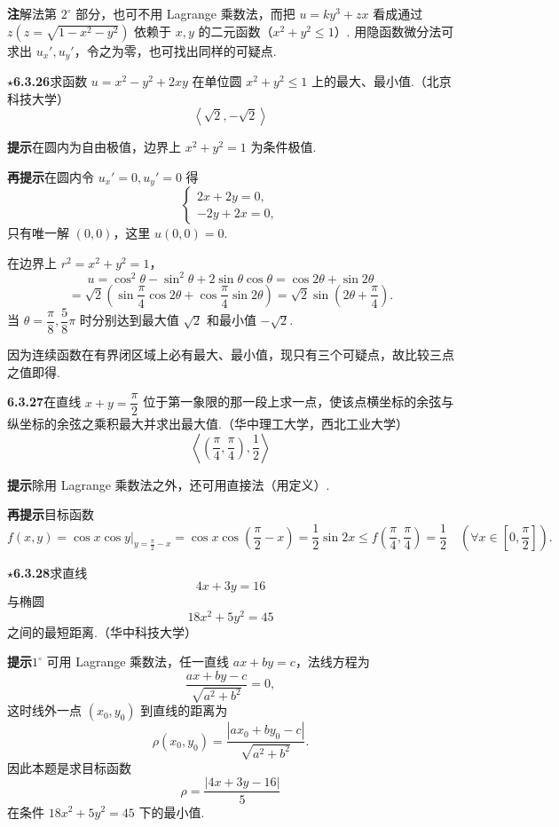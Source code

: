 \documentclass[UTF8,12pt,a4paper,fontset=fandol]{ctexart}
\begin{document}
\noindent\textbf{注}\quad 解法第 $2^\circ$ 部分，也可不用 Lagrange 乘数法，而把 $u=ky^3+zx$ 看成通过 $z(z=\sqrt{1-x^2-y^2})$ 依赖于 $x,y$ 的二元函数（$x^2+y^2\le1$）. 用隐函数微分法可求出 $u_x',u_y'$，令之为零，也可找出同样的可疑点.

\noindent\textbf{\ensuremath{\star}6.3.26}\quad 求函数 $u=x^2-y^2+2xy$ 在单位圆 $x^2+y^2\le1$ 上的最大、最小值.（北京科技大学）
\[
  \left\langle\sqrt2,-\sqrt2\right\rangle
\]

\noindent\textbf{提示}\quad 在圆内为自由极值，边界上 $x^2+y^2=1$ 为条件极值.

\noindent\textbf{再提示}\quad 在圆内令 $u_x'=0,u_y'=0$ 得
\[
  \begin{cases}
    2x+2y=0,\\
    -2y+2x=0,
  \end{cases}
\]
只有唯一解 $(0,0)$，这里 $u(0,0)=0$.

在边界上 $r^2=x^2+y^2=1$，
\[
  u=\cos^2\theta-\sin^2\theta+2\sin\theta\cos\theta
  =\cos2\theta+\sin2\theta
\]
\[
  =\sqrt2\left(\sin\frac\pi4\cos2\theta+\cos\frac\pi4\sin2\theta\right)
  =\sqrt2\sin\left(2\theta+\frac\pi4\right).
\]
当 $\theta=\dfrac\pi8,\dfrac58\pi$ 时分别达到最大值 $\sqrt2$ 和最小值 $-\sqrt2$.

因为连续函数在有界闭区域上必有最大、最小值，现只有三个可疑点，故比较三点之值即得.

\noindent\textbf{6.3.27}\quad 在直线 $x+y=\dfrac\pi2$ 位于第一象限的那一段上求一点，使该点横坐标的余弦与纵坐标的余弦之乘积最大并求出最大值.（华中理工大学，西北工业大学）
\[
  \left\langle\left(\frac\pi4,\frac\pi4\right),\frac12\right\rangle
\]

\noindent\textbf{提示}\quad 除用 Lagrange 乘数法之外，还可用直接法（用定义）.

\noindent\textbf{再提示}\quad 目标函数
\[
  f(x,y)=\cos x\cos y\big|_{y=\frac\pi2-x}
  =\cos x\cos\left(\frac\pi2-x\right)
  =\frac12\sin2x
  \le f\left(\frac\pi4,\frac\pi4\right)=\frac12
  \quad\left(\forall x\in\left[0,\frac\pi2\right]\right).
\]

\noindent\textbf{\ensuremath{\star}6.3.28}\quad 求直线
\[
  4x+3y=16 \tag{1}
\]
与椭圆
\[
  18x^2+5y^2=45 \tag{2}
\]
之间的最短距离.（华中科技大学）

\noindent\textbf{提示}\quad $1^\circ$ 可用 Lagrange 乘数法，任一直线 $ax+by=c$，法线方程为
\[
  \frac{ax+by-c}{\sqrt{a^2+b^2}}=0,
\]
这时线外一点 $(x_0,y_0)$ 到直线的距离为
\[
  \rho(x_0,y_0)=\frac{|ax_0+by_0-c|}{\sqrt{a^2+b^2}}.
\]
因此本题是求目标函数
\[
  \rho=\frac{|4x+3y-16|}{5}
\]
在条件 $18x^2+5y^2=45$ 下的最小值.
\end{document}
